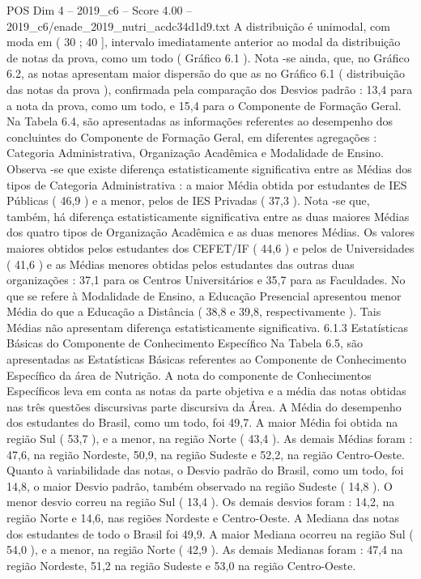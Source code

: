 \begin{textsample}{POS Dim 4 – 2019\_c6 – Score 4.00 – 2019\_c6/enade\_2019\_nutri\_acdc34d1d9.txt}
A distribuição é unimodal, com moda em ( 30 ; 40 ], intervalo imediatamente anterior ao modal da distribuição de notas da prova, como um todo ( Gráfico 6.1 ).
Nota -se ainda, que, no Gráfico 6.2, as notas apresentam maior dispersão do que as no Gráfico 6.1 ( distribuição das notas da prova ), confirmada pela comparação dos Desvios padrão : 13,4 para a nota da prova, como um todo, e 15,4 para o Componente de Formação Geral.
Na Tabela 6.4, são apresentadas as informações referentes ao desempenho dos concluintes do Componente de Formação Geral, em diferentes agregações : Categoria Administrativa, Organização Acadêmica e Modalidade de Ensino.
Observa -se que existe diferença estatisticamente significativa entre as Médias dos tipos de Categoria Administrativa : a maior Média obtida por estudantes de IES Públicas ( 46,9 ) e a menor, pelos de IES Privadas ( 37,3 ).
Nota -se que, também, há diferença estatisticamente significativa entre as duas maiores Médias dos quatro tipos de Organização Acadêmica e as duas menores Médias.
Os valores maiores obtidos pelos estudantes dos CEFET/IF ( 44,6 ) e pelos de Universidades ( 41,6 ) e as Médias menores obtidas pelos estudantes das outras duas organizações : 37,1 para os Centros Universitários e 35,7 para as Faculdades.
No que se refere à Modalidade de Ensino, a Educação Presencial apresentou menor Média do que a Educação a Distância ( 38,8 e 39,8, respectivamente ).
Tais Médias não apresentam diferença estatisticamente significativa. 6.1.3 Estatísticas Básicas do Componente de Conhecimento Específico Na Tabela 6.5, são apresentadas as Estatísticas Básicas referentes ao Componente de Conhecimento Específico da área de Nutrição.
A nota do componente de Conhecimentos Específicos leva em conta as notas da parte objetiva e a média das notas obtidas nas três questões discursivas parte discursiva da Área.
A Média do desempenho dos estudantes do Brasil, como um todo, foi 49,7.
A maior Média foi obtida na região Sul ( 53,7 ), e a menor, na região Norte ( 43,4 ).
As demais Médias foram : 47,6, na região Nordeste, 50,9, na região Sudeste e 52,2, na região Centro-Oeste.
Quanto à variabilidade das notas, o Desvio padrão do Brasil, como um todo, foi 14,8, o maior Desvio padrão, também observado na região Sudeste ( 14,8 ).
O menor desvio correu na região Sul ( 13,4 ).
Os demais desvios foram : 14,2, na região Norte e 14,6, nas regiões Nordeste e Centro-Oeste.
A Mediana das notas dos estudantes de todo o Brasil foi 49,9.
A maior Mediana ocorreu na região Sul ( 54,0 ), e a menor, na região Norte ( 42,9 ).
As demais Medianas foram : 47,4 na região Nordeste, 51,2 na região Sudeste e 53,0 na região Centro-Oeste.

\end{textsample}
